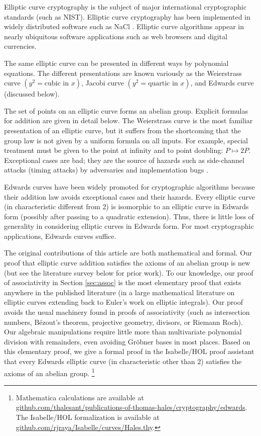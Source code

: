 \documentclass{llncs}
\begin{document}
Elliptic curve cryptography is the subject of major international
cryptographic standards (such as NIST).  Elliptic curve cryptography
has been implemented in widely distributed software such as NaCl
\cite{bernstein2012security}.  Elliptic curve algorithms appear in
nearly ubiquitous software applications such as web browsers and
digital currencies.

The same elliptic curve can be presented in different ways by
polynomial equations.  The different presentations are known variously
as the Weierstrass curve $(y^2 = \text{cubic in } x)$, Jacobi curve
$(y^2 = \text{quartic in } x)$, and Edwards curve (discussed below).

The set of points on an elliptic curve forms an abelian group.  Explicit
formulas for addition are given in detail below.  The Weierstrass
curve is the most familiar presentation of an elliptic curve, but it
suffers from the shortcoming that the group law is not given by a
uniform formula on all inputs.  For example, special treatment must be
given to the point at infinity and to point doubling: $P
\mapsto 2P$.  Exceptional cases are bad; they are the source of 
hazards such as side-channel attacks (timing attacks) by
adversaries and implementation bugs \cite{brier2002weierstrass}.

Edwards curves have been widely promoted for cryptographic algorithms
because their addition law avoids exceptional cases and their hazards.
Every elliptic curve (in characteristic different from $2$) is
isomorphic to an elliptic curve in Edwards form (possibly after
passing to a quadratic extension).  Thus, there is little loss of
generality in considering elliptic curves in Edwards form.  For most
cryptographic applications, Edwards curves suffice.

The original contributions of this article are both mathematical and
formal.  Our proof that elliptic curve addition satisfies the axioms
of an abelian group is new (but see the literature survey below for
prior work).  To our knowledge, our proof of
associativity in Section \ref{sec:assoc} is the most elementary proof
that exists anywhere in the published literature (in a large
mathematical literature on elliptic curves extending back to Euler's
work on elliptic integrals).  Our proof avoids the usual machinery
found in proofs of associativity (such as intersection numbers,
B\'ezout's theorem, projective geometry, divisors, or Riemann Roch).
Our algebraic manipulations require little more than multivariate
polynomial division with remainders, even avoiding Gr\"obner bases
in most places.
Based on this elementary proof, we give a formal proof in the
Isabelle/HOL proof assistant that every Edwards elliptic curve (in
characteristic other than $2$) satisfies the axioms of an abelian
group.%
%
\footnote{Mathematica calculations are available at\\
  \url{github.com/thalesant/publications-of-thomas-hales/cryptography/edwards}.
  The Isabelle/HOL formalization is available at\\
  \url{github.com/rjraya/Isabelle/curves/Hales.thy}.}
\end{document}
